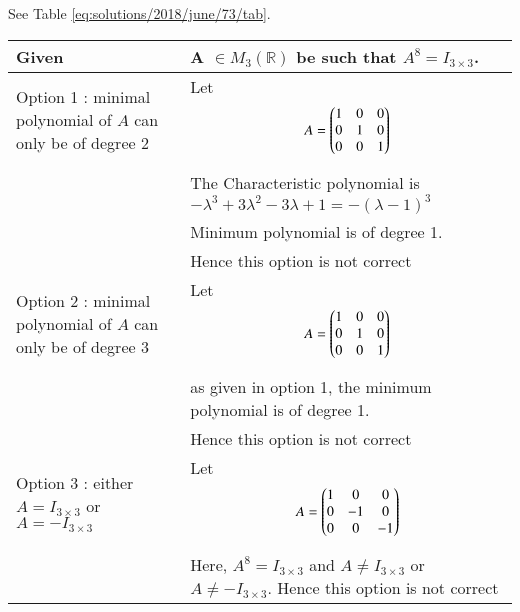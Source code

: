 See Table \ref{eq:solutions/2018/june/73/tab}.

\begin{table*}[ht!]
\begin{center}
\begin{tabular}{ | m{3cm} | m{5cm}| } \hline 
Given  &   A $\in M_3 (\mathbb{R}) $ be such that $A^8 = I_{3 \times 3}$.\\  
  \hline
Option 1 :  minimal polynomial of $A$ can only be of degree 2 & Let {\begin{align*}
 A = \begin{pmatrix}1&0&0\\0&1&0\\0&0&1\end{pmatrix}
\end{align*}}\\&
The Characteristic polynomial is $ -\lambda^3+3\lambda^2-3\lambda+1=-(\lambda-1)^3$\\&
Minimum polynomial is of degree 1. \\&Hence this option is not correct\\  \hline
Option 2 :  minimal polynomial of $A$ can only be of degree 3 & Let {\begin{align*}
 A = \begin{pmatrix}1&0&0\\0&1&0\\0&0&1\end{pmatrix}
\end{align*}}\\&
as given in option 1, the minimum polynomial is of degree 1.\\& Hence this option is not correct\\  \hline
Option 3 :  either $A = I_{3 \times 3}$ or $A = -I_{ 3 \times 3}$ & Let {\begin{align*}
 A = \begin{pmatrix}1&0&0\\0&-1&0\\0&0&-1\end{pmatrix}
\end{align*}}\\&
Here, $A^8 = I_{3 \times 3}$ and $ A \neq I_{3 \times 3}$ or $A \neq -I_{ 3 \times 3}$. Hence this option is not correct\\  \hline
\end{tabular}
\end{center}
\end{table*}
